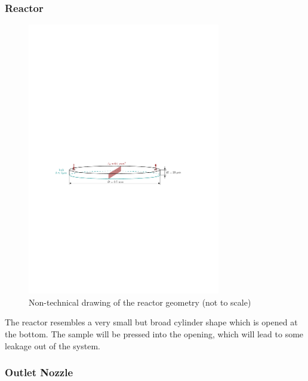 \subsubsection*{Reactor}

	\begin{figure}[H]
	    \centering
	    \includegraphics[width=0.75\textwidth]{src/03_analytical-work/fig_reactor-geometry.pdf}
	    \caption{Non-technical drawing of the reactor geometry (not to scale)}
	    \label{fig:geometry-reactor}
	\end{figure}
	The reactor resembles a very small but broad cylinder shape which is opened at the bottom.
	The sample will be pressed into the opening, which will lead to some leakage out of the system.
	
\subsubsection*{Outlet Nozzle}
	
